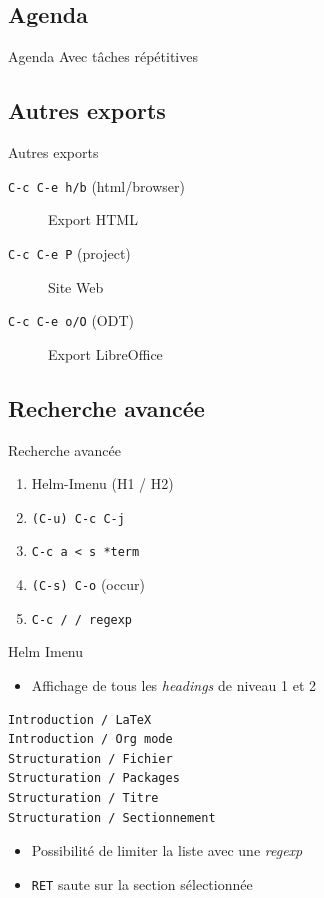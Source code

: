 \documentclass[presentation,t,hideothersubsections]{beamer}
\begin{document}
\subsection{Agenda}
\label{sec-5-4}

\begin{frame}[label=sec-5-4-1]{Agenda}
Avec tâches répétitives
\end{frame}
\subsection{Autres exports}
\label{sec-5-5}

\begin{frame}[fragile,label=sec-5-5-1]{Autres exports}
 \begin{description}
\item[\texttt{C-c C-e h/b} (html/browser)] Export HTML
\item[\texttt{C-c C-e P} (project)] Site Web
\item[\texttt{C-c C-e o/O} (ODT)] Export LibreOffice
\end{description}
\end{frame}
\subsection{Recherche avancée}
\label{sec-5-6}

\begin{frame}[fragile,label=sec-5-6-1]{Recherche avancée}
 \begin{enumerate}
\item Helm-Imenu (H1 / H2)
\item \texttt{(C-u) C-c C-j}
\item \texttt{C-c a < s *term}
\item \texttt{(C-s) C-o} (occur)
\item \texttt{C-c / / regexp}
\end{enumerate}
\end{frame}
\begin{frame}[fragile,label=sec-5-6-2]{Helm Imenu}
 \begin{itemize}
\item Affichage de tous les \emph{headings} de niveau 1 et 2
\end{itemize}

\lstset{language=org,numbers=none}
\begin{lstlisting}
Introduction / LaTeX
Introduction / Org mode
Structuration / Fichier
Structuration / Packages
Structuration / Titre
Structuration / Sectionnement
\end{lstlisting}

\begin{itemize}
\item Possibilité de limiter la liste avec une \emph{regexp}

\item \texttt{RET} saute sur la section sélectionnée
\end{itemize}
\end{frame}
\end{document}
